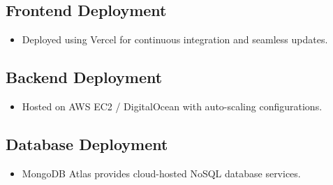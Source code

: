 \subsection{Frontend Deployment}
\begin{itemize}
    \item Deployed using Vercel for continuous integration and seamless updates.
\end{itemize}

\subsection{Backend Deployment}
\begin{itemize}
    \item Hosted on AWS EC2 / DigitalOcean with auto-scaling configurations.
\end{itemize}

\subsection{Database Deployment}
\begin{itemize}
    \item MongoDB Atlas provides cloud-hosted NoSQL database services.
\end{itemize}
